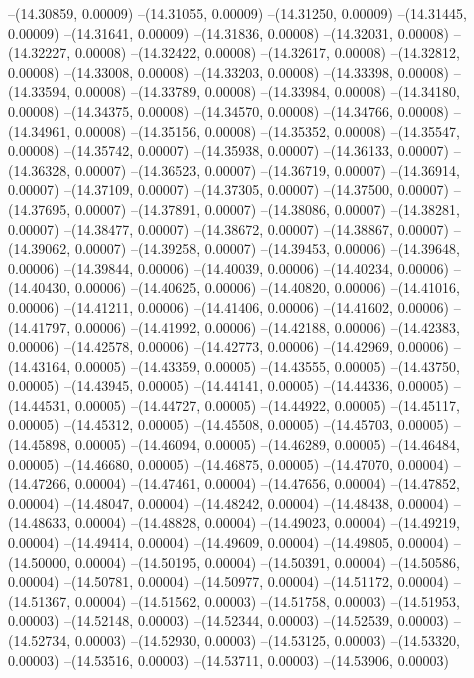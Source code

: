 --(14.30859, 0.00009)
--(14.31055, 0.00009)
--(14.31250, 0.00009)
--(14.31445, 0.00009)
--(14.31641, 0.00009)
--(14.31836, 0.00008)
--(14.32031, 0.00008)
--(14.32227, 0.00008)
--(14.32422, 0.00008)
--(14.32617, 0.00008)
--(14.32812, 0.00008)
--(14.33008, 0.00008)
--(14.33203, 0.00008)
--(14.33398, 0.00008)
--(14.33594, 0.00008)
--(14.33789, 0.00008)
--(14.33984, 0.00008)
--(14.34180, 0.00008)
--(14.34375, 0.00008)
--(14.34570, 0.00008)
--(14.34766, 0.00008)
--(14.34961, 0.00008)
--(14.35156, 0.00008)
--(14.35352, 0.00008)
--(14.35547, 0.00008)
--(14.35742, 0.00007)
--(14.35938, 0.00007)
--(14.36133, 0.00007)
--(14.36328, 0.00007)
--(14.36523, 0.00007)
--(14.36719, 0.00007)
--(14.36914, 0.00007)
--(14.37109, 0.00007)
--(14.37305, 0.00007)
--(14.37500, 0.00007)
--(14.37695, 0.00007)
--(14.37891, 0.00007)
--(14.38086, 0.00007)
--(14.38281, 0.00007)
--(14.38477, 0.00007)
--(14.38672, 0.00007)
--(14.38867, 0.00007)
--(14.39062, 0.00007)
--(14.39258, 0.00007)
--(14.39453, 0.00006)
--(14.39648, 0.00006)
--(14.39844, 0.00006)
--(14.40039, 0.00006)
--(14.40234, 0.00006)
--(14.40430, 0.00006)
--(14.40625, 0.00006)
--(14.40820, 0.00006)
--(14.41016, 0.00006)
--(14.41211, 0.00006)
--(14.41406, 0.00006)
--(14.41602, 0.00006)
--(14.41797, 0.00006)
--(14.41992, 0.00006)
--(14.42188, 0.00006)
--(14.42383, 0.00006)
--(14.42578, 0.00006)
--(14.42773, 0.00006)
--(14.42969, 0.00006)
--(14.43164, 0.00005)
--(14.43359, 0.00005)
--(14.43555, 0.00005)
--(14.43750, 0.00005)
--(14.43945, 0.00005)
--(14.44141, 0.00005)
--(14.44336, 0.00005)
--(14.44531, 0.00005)
--(14.44727, 0.00005)
--(14.44922, 0.00005)
--(14.45117, 0.00005)
--(14.45312, 0.00005)
--(14.45508, 0.00005)
--(14.45703, 0.00005)
--(14.45898, 0.00005)
--(14.46094, 0.00005)
--(14.46289, 0.00005)
--(14.46484, 0.00005)
--(14.46680, 0.00005)
--(14.46875, 0.00005)
--(14.47070, 0.00004)
--(14.47266, 0.00004)
--(14.47461, 0.00004)
--(14.47656, 0.00004)
--(14.47852, 0.00004)
--(14.48047, 0.00004)
--(14.48242, 0.00004)
--(14.48438, 0.00004)
--(14.48633, 0.00004)
--(14.48828, 0.00004)
--(14.49023, 0.00004)
--(14.49219, 0.00004)
--(14.49414, 0.00004)
--(14.49609, 0.00004)
--(14.49805, 0.00004)
--(14.50000, 0.00004)
--(14.50195, 0.00004)
--(14.50391, 0.00004)
--(14.50586, 0.00004)
--(14.50781, 0.00004)
--(14.50977, 0.00004)
--(14.51172, 0.00004)
--(14.51367, 0.00004)
--(14.51562, 0.00003)
--(14.51758, 0.00003)
--(14.51953, 0.00003)
--(14.52148, 0.00003)
--(14.52344, 0.00003)
--(14.52539, 0.00003)
--(14.52734, 0.00003)
--(14.52930, 0.00003)
--(14.53125, 0.00003)
--(14.53320, 0.00003)
--(14.53516, 0.00003)
--(14.53711, 0.00003)
--(14.53906, 0.00003)

